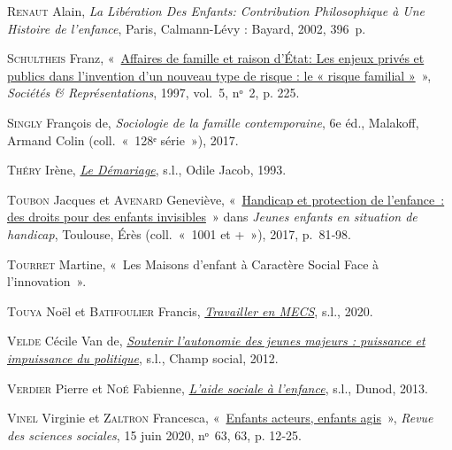 \documentclass[
  12,
  a4paper,
]{report}
\newlength{\cslhangindent}
\newlength{\cslentryspacingunit} %
\newenvironment{CSLReferences}[2] %
 {%
  \setlength{\parindent}{0pt}
  \ifodd #1
  \let\oldpar\par
  \def\par{\hangindent=\cslhangindent\oldpar}
  \fi
  \setlength{\parskip}{#2\cslentryspacingunit}
 }%
 {}
\begin{document}
\begin{CSLReferences}{0}{0}
\leavevmode{}%
\textsc{Renaut} Alain, \emph{La Libération Des Enfants: Contribution
Philosophique à Une Histoire de l'enfance}, {Paris}, {Calmann-Lévy :
Bayard}, 2002, 396~p.

\leavevmode{}%
\textsc{Schultheis} Franz,
{«~\href{https://doi.org/10.3917/sr.005.0225}{Affaires de famille et
raison d'État: Les enjeux privés et publics dans l'invention d'un
nouveau type de risque : le « risque familial »}~»}, \emph{Sociétés \&
Représentations}, 1997, vol.~5, nᵒ~2, p. 225.

\leavevmode{}%
\textsc{Singly} François de, \emph{Sociologie de la famille
contemporaine}, 6e éd., {Malakoff}, {Armand Colin} (coll.~{«~128ᵉ
série~»}), 2017.

\leavevmode{}%
\textsc{Théry} Irène,
\emph{\href{http://www.cairn.info/le-demariage--9782738102096.htm}{Le
Démariage}}, s.l., {Odile Jacob}, 1993.

\leavevmode{}%
\textsc{Toubon} Jacques et \textsc{Avenard} Geneviève,
{«~\href{https://doi.org/10.3917/eres.bauby.2017.01.0081}{Handicap et
protection de l'enfance~: des droits pour des enfants invisibles}~»}
dans \emph{Jeunes enfants en situation de handicap}, {Toulouse}, {Érès}
(coll.~{«~1001 et +~»}), 2017, p.~81‑98.

\leavevmode{}%
\textsc{Tourret} Martine, {«~Les {Maisons} d'enfant à Caractère Social
Face à l'innovation~»}.

\leavevmode{}%
\textsc{Touya} Noël et \textsc{Batifoulier} Francis,
\emph{\href{https://www.cairn.info/travailler-en-mecs--9782100788330.htm}{Travailler
en MECS}}, s.l., 2020.

\leavevmode{}%
\textsc{Velde} Cécile Van de,
\emph{\href{http://www.cairn.info/politiques-de-jeunesse-le-grand-malentendu--9782353712908-page-53.htm}{Soutenir
l'autonomie des jeunes majeurs : puissance et impuissance du
politique}}, s.l., {Champ social}, 2012.

\leavevmode{}%
\textsc{Verdier} Pierre et \textsc{Noé} Fabienne,
\emph{\href{https://doi.org/10.3917/dunod.verdi.2013.01}{L'aide sociale
à l'enfance}}, s.l., {Dunod}, 2013.

\leavevmode{}%
\textsc{Vinel} Virginie et \textsc{Zaltron} Francesca,
{«~\href{https://doi.org/10.4000/revss.4752}{Enfants acteurs, enfants
agis}~»}, \emph{Revue des sciences sociales}, 15 juin 2020, nᵒ~63, 63,
p. 12‑25.

\end{CSLReferences}
\end{document}
